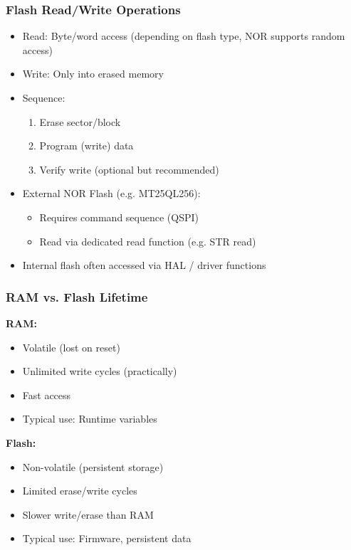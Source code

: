   \begin{minipage}[t]{0.58\linewidth}
  \subsubsection{Flash Read/Write Operations}
    \begin{itemize}
      \item Read: Byte/word access (depending on flash type, NOR supports random access)
      \item Write: Only into erased memory
      \item Sequence:
        \begin{enumerate}
          \item Erase sector/block
          \item Program (write) data
          \item Verify write (optional but recommended)
        \end{enumerate}
      \item External NOR Flash (e.g. MT25QL256):
        \begin{itemize}
          \item Requires command sequence (QSPI)
          \item Read via dedicated read function (e.g. STR read)
        \end{itemize}
        \item Internal flash often accessed via HAL / driver functions
    \end{itemize}
  \end{minipage}

  \subsubsection{RAM vs. Flash Lifetime}
    \begin{minipage}[t]{0.48\linewidth}
      \textbf{RAM:}
      \begin{itemize}
          \item Volatile (lost on reset)
          \item Unlimited write cycles (practically)
          \item Fast access
          \item Typical use: Runtime variables
        \end{itemize}
    \end{minipage}\hfill
    \begin{minipage}[t]{0.48\linewidth}
      \textbf{Flash:}
      \begin{itemize}
        \item Non-volatile (persistent storage)
        \item Limited erase/write cycles
        \item Slower write/erase than RAM
        \item Typical use: Firmware, persistent data
      \end{itemize}
    \end{minipage}

